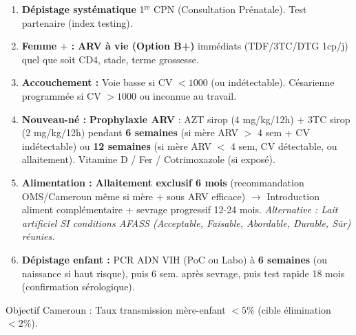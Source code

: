 \documentclass[11pt]{article}
\newcommand{\cle}[1]{{\popxbold\color{popdark}#1}}
\begin{document}
\begin{definition}
\begin{enumerate}
    \item \textbf{Dépistage systématique} 1$^{\text{re}}$ CPN (Consultation Prénatale). Test partenaire (index testing).
    \item \textbf{Femme $+$ :} \textbf{ARV à vie (Option B+)} immédiats (TDF/3TC/DTG 1cp/j) quel que soit CD4, stade, terme grossesse.
    \item \textbf{Accouchement :} Voie basse si CV $< 1000$ (ou indétectable). Césarienne programmée si CV $> 1000$ ou inconnue au travail.
    \item \textbf{Nouveau-né :} \textbf{Prophylaxie ARV} : AZT sirop (4 mg/kg/12h) + 3TC sirop (2 mg/kg/12h) pendant \textbf{6 semaines} (si mère ARV $>$ 4 sem + CV indétectable) ou \textbf{12 semaines} (si mère ARV $<$ 4 sem, CV détectable, ou allaitement). Vitamine D / Fer / Cotrimoxazole (si exposé).
    \item \textbf{Alimentation :} \textbf{Allaitement exclusif 6 mois} (recommandation OMS/Cameroun même si mère $+$ sous ARV efficace) $\rightarrow$ Introduction aliment complémentaire + sevrage progressif 12-24 mois. \emph{Alternative : Lait artificiel SI conditions AFASS (Acceptable, Faisable, Abordable, Durable, Sûr) réunies.}
    \item \textbf{Dépistage enfant :} PCR ADN VIH (PoC ou Labo) à \textbf{6 semaines} (ou naissance si haut risque), puis 6 sem. après sevrage, puis test rapide 18 mois (confirmation sérologique).
\end{enumerate}
\cle{Objectif Cameroun :} Taux transmission mère-enfant $< 5\%$ (cible élimination $< 2\%$).
\end{definition}
\end{document}
